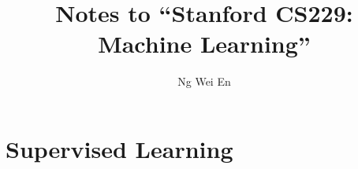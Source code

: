 \documentclass{article}
\title{Notes to ``Stanford CS229: Machine Learning''}
\author{Ng Wei En}
\begin{document}
\maketitle

\section{Supervised Learning}
\end{document}
